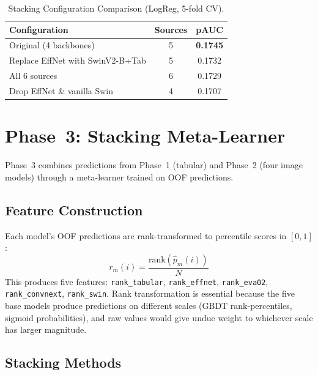 \documentclass[conference]{IEEEtran}
\begin{document}
\begin{table}[!t]
  \centering
  \caption{Stacking Configuration Comparison (LogReg, 5-fold CV).}
  \label{tab:stacking_configs}
  \renewcommand{\arraystretch}{1.1}
  \begin{tabular}{lcc}
    \toprule
    \textbf{Configuration} & \textbf{Sources} & \textbf{pAUC} \\
    \midrule
    Original (4 backbones)              & 5 & \textbf{0.1745} \\
    Replace EffNet with SwinV2-B+Tab    & 5 & 0.1732 \\
    All 6 sources                       & 6 & 0.1729 \\
    Drop EffNet \& vanilla Swin         & 4 & 0.1707 \\
    \bottomrule
  \end{tabular}
\end{table}

\section{Phase~3: Stacking Meta-Learner}
\label{sec:phase3}

Phase~3 combines predictions from Phase~1 (tabular) and Phase~2
(four image models) through a meta-learner trained on OOF predictions.

\subsection{Feature Construction}

Each model's OOF predictions are rank-transformed to percentile
scores in $[0, 1]$:
\begin{equation}
  r_m(i) = \frac{\text{rank}(\hat{p}_m(i))}{N}
  \label{eq:rank_transform}
\end{equation}
This produces five features:
\texttt{rank\_tabular}, \texttt{rank\_effnet}, \texttt{rank\_eva02},
\texttt{rank\_convnext}, \texttt{rank\_swin}.
Rank transformation is essential because the five base models produce
predictions on different scales (GBDT rank-percentiles, sigmoid
probabilities), and raw values would give undue weight to whichever
scale has larger magnitude.

\subsection{Stacking Methods}
\end{document}
